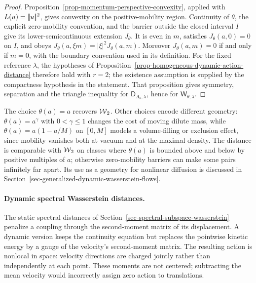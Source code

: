 \begin{proof}
	Proposition~\ref{prop-momentum-perspective-convexity}, applied with \(L(u)=|\!| u |\!|^2\), gives convexity on the positive-mobility region. Continuity of $\theta$, the explicit zero-mobility convention, and the barrier outside the closed interval $I$ give its lower-semicontinuous extension $J_\theta$. It is even in \(m\), satisfies \(J_\theta(a,0)=0\) on $I$, and obeys
	\(J_\theta(a,\xi m)=|\xi|^2J_\theta(a,m)\).
	Moreover \(J_\theta(a,m)=0\) if and only if \(m=0\), with the boundary convention used in its definition. For the fixed reference \(\lambda\), the hypotheses of Proposition~\ref{prop-homogeneous-dynamic-action-distance} therefore hold with \(r=2\); the existence assumption is supplied by the compactness hypothesis in the statement. That proposition gives symmetry, separation and the triangle inequality for \(\mathsf D_{A_\theta,\lambda}\), hence for \(\mathsf W_{\theta,\lambda}\).
\end{proof}

The choice $\theta(a)=a$ recovers $\operatorname{\mathcal{W}}_2$. Other choices encode different geometry: $\theta(a)=a^\gamma$ with $0<\gamma\leq1$ changes the cost of moving dilute mass, while $\theta(a)=a(1-a/M)$ on $[0,M]$ models a volume-filling or exclusion effect, since mobility vanishes both at vacuum and at the maximal density. The distance is comparable with $\operatorname{\mathcal{W}}_2$ on classes where $\theta(a)$ is bounded above and below by positive multiples of $a$; otherwise zero-mobility barriers can make some pairs infinitely far apart. Its use as a geometry for nonlinear diffusion is discussed in Section~\ref{sec-generalized-dynamic-wasserstein-flows}.

\paragraph{Dynamic spectral Wasserstein distances.}
The static spectral distances of Section~\ref{sec-spectral-subspace-wasserstein} penalize a coupling through the second-moment matrix of its displacement. A dynamic version keeps the continuity equation but replaces the pointwise kinetic energy by a gauge of the velocity's second-moment matrix. The resulting action is nonlocal in space: velocity directions are charged jointly rather than independently at each point. These moments are not centered; subtracting the mean velocity would incorrectly assign zero action to translations.

